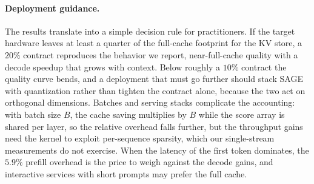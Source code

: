\paragraph{Deployment guidance.}
The results translate into a simple decision rule for practitioners.
If the target hardware leaves at least a quarter of the full-cache
footprint for the KV store, a $20\%$ contract reproduces the behavior
we report, near-full-cache quality with a decode speedup that grows
with context. Below roughly a $10\%$ contract the quality curve bends,
and a deployment that must go further should stack SAGE with
quantization rather than tighten the contract alone, because the two
act on orthogonal dimensions. Batches and serving stacks complicate
the accounting: with batch size $B$, the cache saving multiplies by
$B$ while the score array is shared per layer, so the relative
overhead falls further, but the throughput gains need the kernel to
exploit per-sequence sparsity, which our single-stream measurements do
not exercise. When the latency of the first token dominates, the
$5.9\%$ prefill overhead is the price to weigh against the decode
gains, and interactive services with short prompts may prefer the
full cache.
